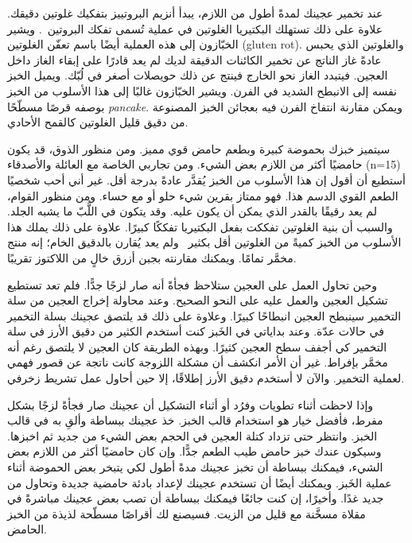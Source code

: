 عند تخمير عجينك لمدةً أطول من اللازم، يبدأ أنزيم البروتييز بتفكيك غلوتين دقيقك. علاوة على ذلك تستهلك البكتيريا الغلوتين في عملية تُسمى تفكك البروتين~\cite{raffaella+di+cagno}. ويشير الخبّازون إلى هذه العملية أيضًا باسم تعفّن الغلوتين \textenglish{(gluten rot)}. والغلوتين الذي يحبس عادةً غاز  الناتج عن تخمير الكائنات الدقيقة لديك لم يعد قادرًا على إبقاء الغاز داخل العجين. فيتبدد الغاز نحو الخارج فينتج عن ذلك حويصلات أصغر في لُبّك. ويميل الخبز نفسه إلى الانبطح الشديد في الفرن. ويشير الخبّازون غالبًا إلى هذا الأسلوب من الخبز بوصفه قرصًا مسطّحًا \textenglish{\emph{pancake}}. ويمكن مقارنة انتفاخ الفرن فيه بعجائن الخبز المصنوعة من دقيق قليل الغلوتين كالقمح الأحادي.

سيتميز خبزك بحموضة كبيرة وبطعم حامض قوي مميز. ومن منظور الذوق، قد يكون حامضيًا أكثر من اللازم بعض الشيء. ومن تجاربي الخاصة مع العائلة والأصدقاء \textenglish{(n=15)} أستطيع أن أقول إن هذا الأسلوب من الخبز يُقدَّر عادةً بدرجة أقل. غير أني أحب شخصيًا الطعم القوي الدسم هذا. فهو ممتاز بقرين شيء حلو أو مع حساء. ومن منظور القوام، لم يعد رقيقًا بالقدر الذي يمكن أن يكون عليه. وقد يتكون في اللُّبّ ما يشبه الجلد. والسبب أن بنية الغلوتين تفككت بفعل البكتيريا تفككًا كبيرًا. علاوة على ذلك يملك هذا الأسلوب من الخبز كميةً من الغلوتين أقل بكثير~\cite{raffaella+di+cagno} ولم يعد يُقارن بالدقيق الخام؛ إنه منتج مخمَّر تمامًا. ويمكنك مقارنته بجبن أزرق خالٍ من اللاكتوز تقريبًا.

وحين تحاول العمل على العجين ستلاحظ فجأةً أنه صار لزجًا جدًّا. فلم تعد تستطيع تشكيل العجين والعمل عليه على النحو الصحيح. وعند محاولة إخراج العجين من سلة التخمير سينبطح العجين انبطاحًا كبيرًا. وعلاوة على ذلك قد يلتصق عجينك بسلة التخمير في حالات عدّة. وعند بداياتي في الخَبز كنت أستخدم الكثير من دقيق الأرز في سلة التخمير كي أجفف سطح العجين كثيرًا. وبهذه الطريقة كان العجين لا يلتصق رغم أنه مخمَّر بإفراط. غير أن الأمر انكشف أن مشكلة اللزوجة كانت ناتجة عن قصور فهمي لعملية التخمير. والآن لا أستخدم دقيق الأرز إطلاقًا، إلا حين أحاول عمل تشريط زخرفي.

وإذا لاحظت أثناء تطويات وفرُد أو أثناء التشكيل أن عجينك صار فجأةً لزجًا بشكل مفرط، فأفضل خيار هو استخدام قالب الخبز. خذ عجينك ببساطة وألقِ به في قالب الخبز. وانتظر حتى تزداد كتلة العجين في الحجم بعض الشيء من جديد ثم اخبزها. وسيكون عندك خبز حامض طيب الطعم جدًّا. وإن كان حامضيًا أكثر من اللازم بعض الشيء، فيمكنك ببساطة أن تخبز عجينك مدةً أطول لكي يتبخر بعض الحموضة أثناء عملية الخَبز. ويمكنك أيضًا أن تستخدم عجينك لإعداد بادئة حامضية جديدة وتحاول من جديد غدًا. وأخيرًا، إن كنت جائعًا فيمكنك ببساطة أن تصب بعض عجينك مباشرةً في مقلاة مسخَّنة مع قليل من الزيت. فسيصنع لك أقراصًا مسطّحة لذيذة من الخبز الحامض.

